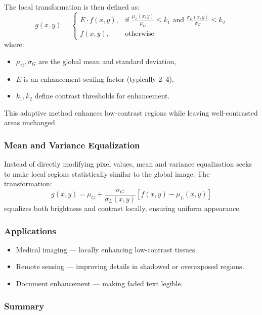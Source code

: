 \documentclass[12pt,a4paper]{AnantDocumentation}
\begin{document}
The local transformation is then defined as:
\begin{equation}
g(x, y) =
\begin{cases}
E \cdot f(x, y), & \text{if } \frac{\mu_L(x, y)}{\mu_G} \le k_1 \text{ and } \frac{\sigma_L(x, y)}{\sigma_G} \le k_2 \\
f(x, y), & \text{otherwise}
\end{cases}
\end{equation}
where:
\begin{itemize}
\item $\mu_G, \sigma_G$ are the global mean and standard deviation,
\item $E$ is an enhancement scaling factor (typically 2–4),
\item $k_1, k_2$ define contrast thresholds for enhancement.
\end{itemize}

This adaptive method enhances low-contrast regions while leaving well-contrasted areas unchanged.

\subsubsection{Mean and Variance Equalization}

Instead of directly modifying pixel values, mean and variance equalization seeks to make local regions statistically similar to the global image.  
The transformation:
\begin{equation}
g(x, y) = \mu_G + \frac{\sigma_G}{\sigma_L(x, y)} [f(x, y) - \mu_L(x, y)]
\end{equation}
equalizes both brightness and contrast locally, ensuring uniform appearance.

\subsubsection{Applications}

\begin{itemize}
\item Medical imaging — locally enhancing low-contrast tissues.
\item Remote sensing — improving details in shadowed or overexposed regions.
\item Document enhancement — making faded text legible.
\end{itemize}

\subsubsection{Summary}
\end{document}

